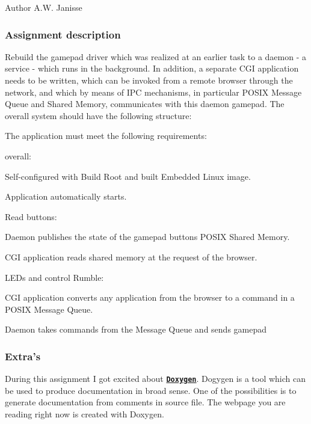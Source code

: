 \begin{DoxyAuthor}{Author}
A.\-W. Janisse \par
\par
 
\end{DoxyAuthor}
\subsubsection*{Assignment description}

Rebuild the gamepad driver which was realized at an earlier task to a daemon -\/ a service -\/ which runs in the background. In addition, a separate C\-G\-I application needs to be written, which can be invoked from a remote browser through the network, and which by means of I\-P\-C mechanisms, in particular P\-O\-S\-I\-X Message Queue and Shared Memory, communicates with this daemon gamepad. The overall system should have the following structure\-:



The application must meet the following requirements\-: 
\begin{DoxyItemize}
\item overall\-: 
\begin{DoxyItemize}
\item Self-\/configured with Build Root and built Embedded Linux image. 
\item Application automatically starts. 
\end{DoxyItemize}
\item Read buttons\-: 
\begin{DoxyItemize}
\item Daemon publishes the state of the gamepad buttons P\-O\-S\-I\-X Shared Memory. 
\item C\-G\-I application reads shared memory at the request of the browser. 
\end{DoxyItemize}
\item L\-E\-Ds and control Rumble\-: 
\begin{DoxyItemize}
\item C\-G\-I application converts any application from the browser to a command in a P\-O\-S\-I\-X Message Queue. 
\item Daemon takes commands from the Message Queue and sends gamepad 
\end{DoxyItemize}
\end{DoxyItemize}\subsubsection*{Extra's}

During this assignment I got excited about \href{http://www.stack.nl/~dimitri/doxygen/index.html}{\tt {\bfseries Doxygen}}. Dogygen is a tool which can be used to produce documentation in broad sense. One of the possibilities is to generate documentation from comments in source file. The webpage you are reading right now is created with Doxygen. 